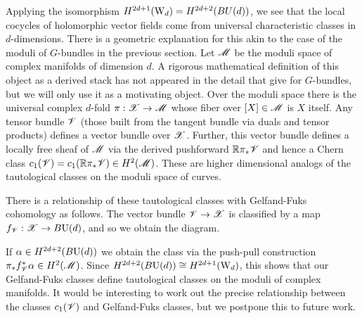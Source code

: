 Applying the isomorphism $H^{2d+1}({\rm W}_d) = H^{2d+2}(BU(d))$, we see that the local cocycles of holomorphic vector fields come from universal characteristic classes in $d$-dimensions. 
There is a geometric explanation for this akin to the case of the moduli of $G$-bundles in the previous section.
Let $\mathscr M$ be the moduli space of complex manifolds of dimension $d$.
A rigorous mathematical definition of this object as a derived stack has not appeared in the detail that \cite{FHK} give for $G$-bundles, but we will only use it as a motivating object. 
Over the moduli space there is the universal complex $d$-fold $\pi : \mathscr X \to \mathscr M$ whose fiber over $[X] \in \mathscr M$ is $X$ itself. 
Any tensor bundle $\mathscr V$ (those built from the tangent bundle via duals and tensor products) defines a vector bundle over $\mathscr X$. 
Further, this vector bundle defines a locally free sheaf of $\mathscr M$ via the derived pushforward $\mathbb R \pi_* \mathscr V$ and hence a Chern class $c_1(\mathscr V) = c_1(\mathbb R \pi_* \mathscr V) \in H^2(\mathscr M)$. 
These are higher dimensional analogs of the tautological classes on the moduli space of curves.

There is a relationship of these tautological classes with Gelfand-Fuks cohomology as follows. The vector bundle $\mathscr V \to \mathscr X$ is classified by a map $f_{\mathscr V} : \mathscr X \to B {\rm U}(d)$, and so we obtain the diagram. 
\ben
{}
\een
If $\alpha \in H^{2d+2} (B {\rm U}(d))$ we obtain the class via the push-pull construction $\pi_* f_{\mathscr V}^* \alpha \in H^2(\mathscr M)$.
Since $H^{2d+2} (B {\rm U}(d)) \cong H^{2d+1}({\rm W}_d)$, this shows that our Gelfand-Fuks classes define tautological classes on the moduli of complex manifolds. 
It would be interesting to work out the precise relationship between the classes $c_1(\mathscr V)$ and Gelfand-Fuks classes, but we postpone this to future work.


